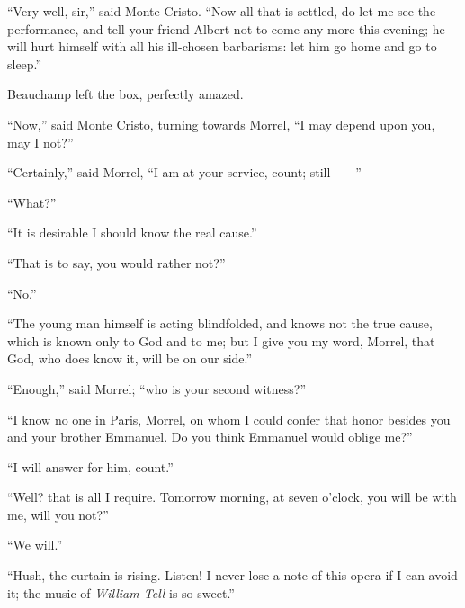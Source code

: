 “Very well, sir,” said Monte Cristo. “Now all that is settled, do let
me see the performance, and tell your friend Albert not to come any
more this evening; he will hurt himself with all his ill-chosen
barbarisms: let him go home and go to sleep.”

Beauchamp left the box, perfectly amazed.

“Now,” said Monte Cristo, turning towards Morrel, “I may depend upon
you, may I not?”

“Certainly,” said Morrel, “I am at your service, count; still——”

“What?”

“It is desirable I should know the real cause.”

“That is to say, you would rather not?”

“No.”

“The young man himself is acting blindfolded, and knows not the true
cause, which is known only to God and to me; but I give you my word,
Morrel, that God, who does know it, will be on our side.”

“Enough,” said Morrel; “who is your second witness?”

“I know no one in Paris, Morrel, on whom I could confer that honor
besides you and your brother Emmanuel. Do you think Emmanuel would
oblige me?”

“I will answer for him, count.”

“Well? that is all I require. Tomorrow morning, at seven o’clock, you
will be with me, will you not?”

“We will.”

“Hush, the curtain is rising. Listen! I never lose a note of this opera
if I can avoid it; the music of \textit{William Tell} is so sweet.”
